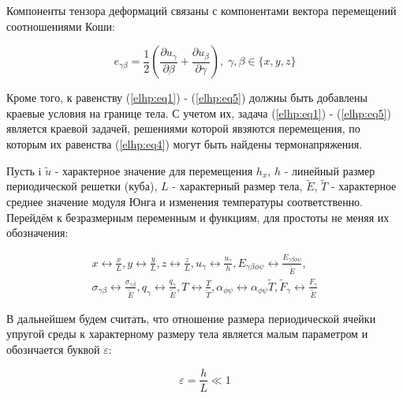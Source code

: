 Компоненты тензора деформаций связаны с компонентами вектора перемещений соотношениями Коши:

\begin{equation}
    \label{elhp:eq5}
    e_{\gamma\beta} = \frac{1}{2} \left( \frac{\partial u_{\gamma}}{\partial \beta} + \frac{\partial u_{\beta}}{\partial \gamma}  \right) 
    ,\; \gamma,\beta \in \{x,y,z\} 
\end{equation}

Кроме того, к равенству 
(\ref{elhp:eq1})
-
(\ref{elhp:eq5}) 
должны быть добавлены краевые условия на границе тела. 
С учетом их, задача 
(\ref{elhp:eq1})
-
(\ref{elhp:eq5}) 
является краевой задачей, решениями 
которой явзяются перемещения, по которым их равенства 
(\ref{elhp:eq4}) 
могут быть найдены термонапряжения.

Пусть i
$ \widetilde{u} $ 
- характерное значение для перемещения 
$h_x$, $h$ 
- линейный размер периодической решетки (куба), 
$L$ 
- характерный размер тела,
$ \widetilde{E}$, $ \widetilde{T}$ 
- характерное среднее значение модуля Юнга и изменения температуры соответственно. Перейдём к безразмерным переменным и функциям,
для простоты не меняя их обозначения:

\begin{equation}
    \label{elhp:eq6}
    \begin{aligned}
        x \leftrightarrow \frac{x}{L}, 
        y \leftrightarrow \frac{y}{L}, 
        z \leftrightarrow \frac{z}{L},
        u_{\gamma} \leftrightarrow \frac{u_{\gamma}}{h},
        E_{\gamma\beta\phi\psi} \leftrightarrow \frac{E_{\gamma\beta\phi\psi}}{ \widetilde{E}},
        \\
        \sigma_{\gamma\beta}\leftrightarrow \frac{\sigma_{\gamma\beta}}{ \widetilde{E}},
        q_{\gamma} \leftrightarrow \frac{q_{\gamma}}{ \widetilde{E}},
        T \leftrightarrow \frac{T}{ \widetilde{T}},
        \alpha_{\phi\psi} \leftrightarrow \alpha_{\phi\psi} \widetilde{T},
        \widetilde{F}_{\gamma} \leftrightarrow \frac{F_{\gamma}}{ \widetilde{E}}
    \end{aligned}
\end{equation}

В дальнейшем будем считать, что отношение размера периодической ячейки упругой среды к характерному размеру тела является малым параметром
и обознчается буквой 
$\varepsilon$:

\begin{equation}
    \label{elhp:eq7}
    \varepsilon = \frac{h}{L} \ll 1
\end{equation}

